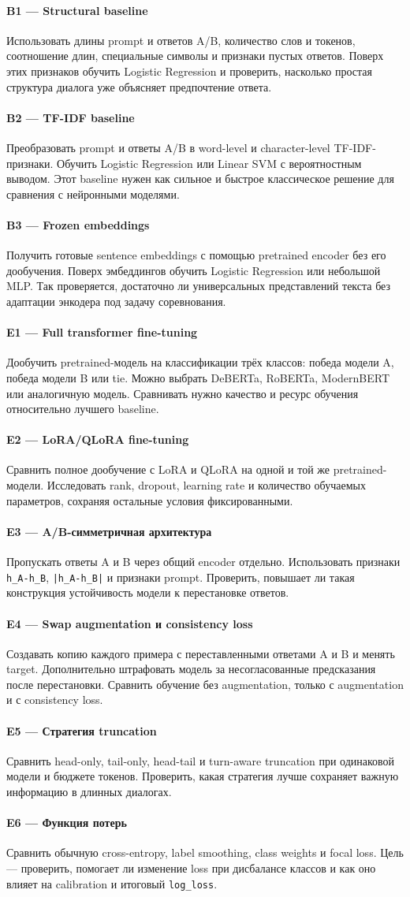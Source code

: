 \documentclass[a4paper,11pt]{article}
\newcommand{\code}[1]{\texttt{#1}}
\newcommand{\experiment}[2]{\paragraph{\textcolor{accent}{#1 --- #2}}}
\begin{document}
\experiment{B1}{Structural baseline}
Использовать длины prompt и ответов A/B, количество слов и токенов,
соотношение длин, специальные символы и признаки пустых ответов. Поверх этих
признаков обучить Logistic Regression и проверить, насколько простая структура
диалога уже объясняет предпочтение ответа.

\experiment{B2}{TF-IDF baseline}
Преобразовать prompt и ответы A/B в word-level и character-level TF-IDF-признаки.
Обучить Logistic Regression или Linear SVM с вероятностным выводом. Этот
baseline нужен как сильное и быстрое классическое решение для сравнения
с нейронными моделями.

\experiment{B3}{Frozen embeddings}
Получить готовые sentence embeddings с помощью pretrained encoder без его
дообучения. Поверх эмбеддингов обучить Logistic Regression или небольшой MLP.
Так проверяется, достаточно ли универсальных представлений текста без адаптации
энкодера под задачу соревнования.

\experiment{E1}{Full transformer fine-tuning}
Дообучить pretrained-модель на классификации трёх классов: победа модели A,
победа модели B или tie. Можно выбрать DeBERTa, RoBERTa, ModernBERT или
аналогичную модель. Сравнивать нужно качество и ресурс обучения относительно
лучшего baseline.

\experiment{E2}{LoRA/QLoRA fine-tuning}
Сравнить полное дообучение с LoRA и QLoRA на одной и той же pretrained-модели.
Исследовать rank, dropout, learning rate и количество обучаемых параметров,
сохраняя остальные условия фиксированными.

\experiment{E3}{A/B-симметричная архитектура}
Пропускать ответы A и B через общий encoder отдельно. Использовать признаки
\code{h\_A-h\_B}, \code{|h\_A-h\_B|} и признаки prompt. Проверить, повышает ли
такая конструкция устойчивость модели к перестановке ответов.

\experiment{E4}{Swap augmentation и consistency loss}
Создавать копию каждого примера с переставленными ответами A и B и менять target.
Дополнительно штрафовать модель за несогласованные предсказания после перестановки.
Сравнить обучение без augmentation, только с augmentation и с consistency loss.

\experiment{E5}{Стратегия truncation}
Сравнить head-only, tail-only, head-tail и turn-aware truncation при одинаковой
модели и бюджете токенов. Проверить, какая стратегия лучше сохраняет важную
информацию в длинных диалогах.

\experiment{E6}{Функция потерь}
Сравнить обычную cross-entropy, label smoothing, class weights и focal loss.
Цель --- проверить, помогает ли изменение loss при дисбалансе классов и как оно
влияет на calibration и итоговый \code{log\_loss}.
\end{document}
